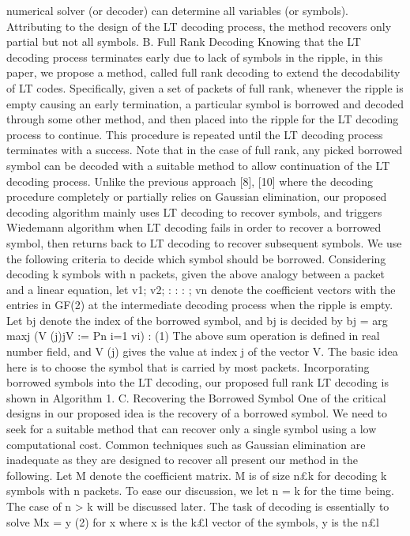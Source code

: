 \documentclass[12pt,a4paper,titlepage,twocolumn]{article}
\begin{document}
numerical solver (or decoder) can determine all variables (or
symbols). Attributing to the design of the LT decoding process,
the method recovers only partial but not all symbols.
B. Full Rank Decoding
Knowing that the LT decoding process terminates early due
to lack of symbols in the ripple, in this paper, we propose a
method, called full rank decoding to extend the decodability
of LT codes. Specifically, given a set of packets of full rank,
whenever the ripple is empty causing an early termination,
a particular symbol is borrowed and decoded through some
other method, and then placed into the ripple for the LT
decoding process to continue. This procedure is repeated until
the LT decoding process terminates with a success. Note that
in the case of full rank, any picked borrowed symbol can be
decoded with a suitable method to allow continuation of the
LT decoding process. Unlike the previous approach [8], [10]
where the decoding procedure completely or partially relies
on Gaussian elimination, our proposed decoding algorithm
mainly uses LT decoding to recover symbols, and triggers
Wiedemann algorithm when LT decoding fails in order to
recover a borrowed symbol, then returns back to LT decoding
to recover subsequent symbols.
We use the following criteria to decide which symbol
should be borrowed. Considering decoding k symbols with
n packets, given the above analogy between a packet and
a linear equation, let v1; v2; : : : ; vn denote the coefficient
vectors with the entries in GF(2) at the intermediate decoding
process when the ripple is empty. Let bj denote the index of
the borrowed symbol, and bj is decided by
bj = arg maxj (V (j)jV :=
Pn
i=1 vi) : (1)
The above sum operation is defined in real number field, and
V (j) gives the value at index j of the vector V. The basic idea
here is to choose the symbol that is carried by most packets.
Incorporating borrowed symbols into the LT decoding, our
proposed full rank LT decoding is shown in Algorithm 1.
C. Recovering the Borrowed Symbol
One of the critical designs in our proposed idea is the
recovery of a borrowed symbol. We need to seek for a suitable
method that can recover only a single symbol using a low
computational cost. Common techniques such as Gaussian
elimination are inadequate as they are designed to recover all present our method in the following.
Let M denote the coefficient matrix. M is of size n£k for
decoding k symbols with n packets. To ease our discussion,
we let n = k for the time being. The case of n > k will be
discussed later. The task of decoding is essentially to solve
Mx = y (2)
for x where x is the k£l vector of the symbols, y is the n£l
\end{document}
